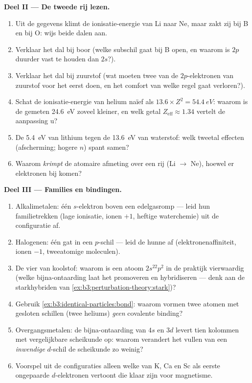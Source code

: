 \begin{problem}
\medskip\noindent\textbf{Deel II --- De tweede rij lezen.}
\begin{enumerate}[resume]
  \item Uit de gegevens klimt de ionisatie-energie van Li naar Ne, maar
        zakt zij bij B en bij O: wijs beide dalen aan.
  \item Verklaar het dal bij boor (welke subschil gaat bij B open, en
        waarom is $2p$ duurder vast te houden dan $2s$?).
  \item Verklaar het dal bij zuurstof (wat moeten twee van de
        $2p$-elektronen van zuurstof voor het eerst doen, en het comfort
        van welke regel gaat verloren?).
  \item Schat de ionisatie-energie van helium naïef als $13.6 \times Z^2 = \qty{54.4}{eV}$: waarom is de gemeten \qty{24.6}{eV} zoveel
        kleiner, en welk getal $Z_{\text{eff}} \approx 1.34$ vertelt de
        aanpassing u?
  \item De \qty{5.4}{eV} van lithium tegen de \qty{13.6}{eV} van
        waterstof: welk tweetal effecten (afscherming; hogere $n$) spant
        samen?
  \item Waarom \emph{krimpt} de atomaire afmeting over een rij (Li $\to$
        Ne), hoewel er elektronen bij komen?
\end{enumerate}

\medskip\noindent\textbf{Deel III --- Families en bindingen.}
\begin{enumerate}[resume]
  \item Alkalimetalen: één $s$-elektron boven een edelgasromp --- leid
        hun familietrekken (lage ionisatie, ionen $+1$, heftige
        waterchemie) uit de configuratie af.
  \item Halogenen: één gat in een $p$-schil --- leid de hunne af
        (elektronenaffiniteit, ionen $-1$, tweeatomige moleculen).
  \item De vier van koolstof: waarom is een atoom $2s^22p^2$ in de
        praktijk vierwaardig (welke bijna-ontaarding laat het promoveren
        en hybridiseren --- denk aan de starkhybriden van
        \cref{ex:b3:perturbation-theory:stark})?
  \item Gebruik \cref{ex:b3:identical-particles:bond}: waarom vormen twee
        atomen met gesloten schillen (twee heliums) \emph{geen} covalente
        binding?
  \item Overgangsmetalen: de bijna-ontaarding van $4s$ en $3d$ levert
        tien kolommen met vergelijkbare scheikunde op: waarom verandert
        het vullen van een \emph{inwendige} $d$-schil de scheikunde zo
        weinig?
  \item Voorspel uit de configuraties alleen welke van K, Ca en Sc als
        eerste ongepaarde $d$-elektronen vertoont die klaar zijn voor
        magnetisme.
\end{enumerate}


\end{problem}
